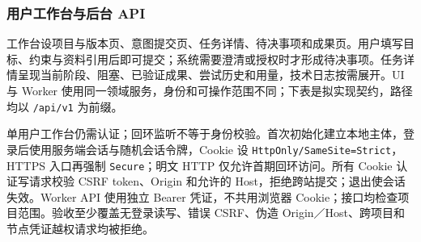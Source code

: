 \documentclass[11pt,a4paper]{article}
\begin{document}
\subsubsection{用户工作台与后台 API}

工作台设项目与版本页、意图提交页、任务详情、待决事项和成果页。用户填写目标、约束与资料引用后即可提交；系统需要澄清或授权时才形成待决事项。任务详情呈现当前阶段、阻塞、已验证成果、尝试历史和用量，技术日志按需展开。UI 与 Worker 使用同一领域服务，身份和可操作范围不同；下表是拟实现契约，路径均以 \texttt{/api/v1} 为前缀。

单用户工作台仍需认证；回环监听不等于身份校验。首次初始化建立本地主体，登录后使用服务端会话与随机会话令牌，Cookie 设 \texttt{HttpOnly/SameSite=Strict}，HTTPS 入口再强制 \texttt{Secure}；明文 HTTP 仅允许首期回环访问。所有 Cookie 认证写请求校验 CSRF token、Origin 和允许的 Host，拒绝跨站提交；退出使会话失效。Worker API 使用独立 Bearer 凭证，不共用浏览器 Cookie；接口均检查项目范围。验收至少覆盖无登录读写、错误 CSRF、伪造 Origin／Host、跨项目和节点凭证越权请求均被拒绝。
\end{document}
